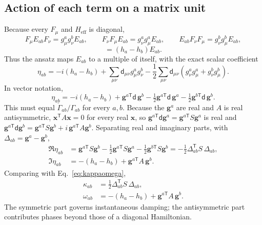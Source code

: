 \documentclass[11pt,a4paper]{article}
\newcommand{\dmat}{\mathsf d}
\newcommand{\Heff}{H_{\mathrm{eff}}}
\begin{document}
\subsection{Action of each term on a matrix unit}

Because every $F_\mu$ and $\Heff$ is diagonal,
\begin{equation}
 F_\mu E_{ab}F_\nu=g_\mu^ag_\nu^bE_{ab},\qquad
 F_\nu F_\mu E_{ab}=g_\nu^ag_\mu^aE_{ab},\qquad
 E_{ab}F_\nu F_\mu=g_\nu^bg_\mu^bE_{ab},
\end{equation}
\begin{equation}
 [\Heff,E_{ab}]=(h_a-h_b)E_{ab}.
\end{equation}
Thus the ansatz maps $E_{ab}$ to a multiple of itself, with the exact
scalar coefficient
\begin{equation}
 \eta_{ab}=-i(h_a-h_b)
 +\sum_{\mu\nu}\dmat_{\mu\nu}g_\mu^ag_\nu^b
 -\frac12\sum_{\mu\nu}\dmat_{\mu\nu}(g_\nu^ag_\mu^a+g_\nu^bg_\mu^b).
\end{equation}
In vector notation,
\begin{equation}
 \boxed{\eta_{ab}=-i(h_a-h_b)
 +\mathbf g^{a\mathsf T}\dmat\,\mathbf g^b
 -\tfrac12\mathbf g^{a\mathsf T}\dmat\,\mathbf g^a
 -\tfrac12\mathbf g^{b\mathsf T}\dmat\,\mathbf g^b.}
 \label{eq:elementwise}
\end{equation}
This must equal $\dot\Gamma_{ab}/\Gamma_{ab}$ for every $a,b$.
Because the $\mathbf g^a$ are real and $A$ is real antisymmetric,
$\mathbf x^{\mathsf T}A\mathbf x=0$ for every real $\mathbf x$, so
$\mathbf g^{a\mathsf T}\dmat\mathbf g^a=\mathbf g^{a\mathsf T}S\mathbf g^a$ is real
and $\mathbf g^{a\mathsf T}\dmat\mathbf g^b
=\mathbf g^{a\mathsf T}S\mathbf g^b+i\,\mathbf g^{a\mathsf T}A\mathbf g^b$.
Separating real and imaginary parts, with
$\Delta_{ab}=\mathbf g^a-\mathbf g^b$,
\begin{align}
 \Re\eta_{ab}&=\mathbf g^{a\mathsf T}S\mathbf g^b
 -\tfrac12\mathbf g^{a\mathsf T}S\mathbf g^a-\tfrac12\mathbf g^{b\mathsf T}S\mathbf g^b
 =-\tfrac12\Delta_{ab}^{\mathsf T}S\,\Delta_{ab},\\
 \Im\eta_{ab}&=-(h_a-h_b)+\mathbf g^{a\mathsf T}A\,\mathbf g^b .
\end{align}
Comparing with Eq.~\eqref{eq:kappaomega},
\begin{align}
 \kappa_{ab}&=\tfrac12\Delta_{ab}^{\mathsf T}S\,\Delta_{ab},
 \label{eq:kappaS}\\
 \omega_{ab}&=-(h_a-h_b)+\mathbf g^{a\mathsf T}A\,\mathbf g^b.
 \label{eq:omegaA}
\end{align}
The symmetric part governs instantaneous damping; the antisymmetric
part contributes phases beyond those of a diagonal Hamiltonian.
\end{document}
